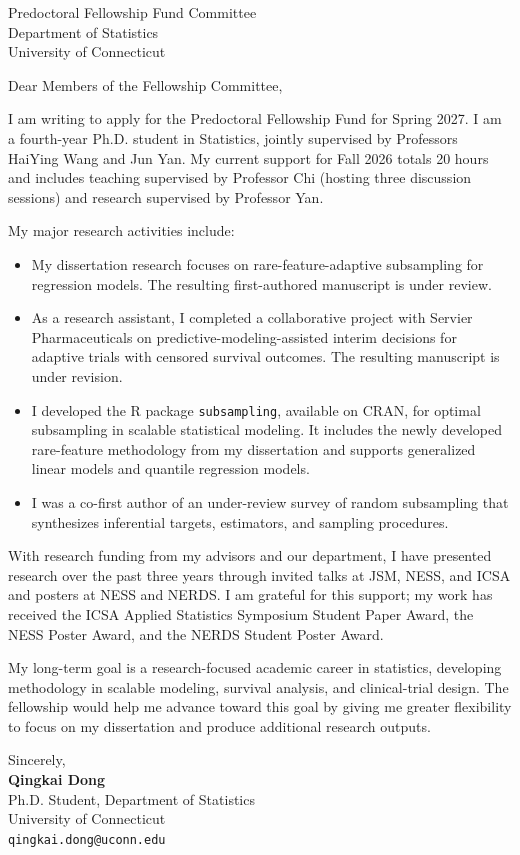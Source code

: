 \documentclass[12pt]{letter}
\begin{document}
\begin{letter}{Predoctoral Fellowship Fund Committee\\
Department of Statistics\\
University of Connecticut}

\date{October 22, 2026}
\opening{Dear Members of the Fellowship Committee,}

I am writing to apply for the Predoctoral Fellowship Fund for Spring 2027. I am a fourth-year Ph.D. student in Statistics, jointly supervised by Professors HaiYing Wang and Jun Yan. My current support for Fall 2026 totals 20 hours and includes teaching supervised by Professor Chi (hosting three discussion sessions) and research supervised by Professor Yan.

My major research activities include:
\begin{itemize}
  \item My dissertation research focuses on rare-feature-adaptive subsampling for regression models. The resulting first-authored manuscript is under review.
  \item As a research assistant, I completed a collaborative project with Servier Pharmaceuticals on predictive-modeling-assisted interim decisions for adaptive trials with censored survival outcomes. The resulting manuscript is under revision.
  \item I developed the R package \texttt{subsampling}, available on CRAN, for optimal subsampling in scalable statistical modeling. It includes the newly developed rare-feature methodology from my dissertation and supports generalized linear models and quantile regression models.
  \item I was a co-first author of an under-review survey of random subsampling that synthesizes inferential targets, estimators, and sampling procedures.
\end{itemize}

With research funding from my advisors and our department, I have presented research over the past three years through invited talks at JSM, NESS, and ICSA and posters at NESS and NERDS. I am grateful for this support; my work has received the ICSA Applied Statistics Symposium Student Paper Award, the NESS Poster Award, and the NERDS Student Poster Award.

My long-term goal is a research-focused academic career in statistics, developing methodology in scalable modeling, survival analysis, and clinical-trial design. The fellowship would help me advance toward this goal by giving me greater flexibility to focus on my dissertation and produce additional research outputs.

Sincerely,\\[0.75em]
\textbf{Qingkai Dong}\\
Ph.D. Student, Department of Statistics\\
University of Connecticut\\
\texttt{qingkai.dong@uconn.edu}

\end{letter}
\end{document}
